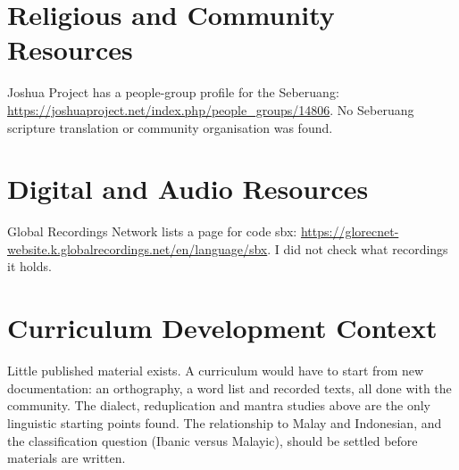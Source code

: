 \documentclass[12pt]{article}
\begin{document}
\section{Religious and Community Resources}
Joshua Project has a people-group profile for the Seberuang: \url{https://joshuaproject.net/index.php/people_groups/14806}. No Seberuang scripture translation or community organisation was found.

\section{Digital and Audio Resources}
Global Recordings Network lists a page for code sbx: \url{https://glorecnet-website.k.globalrecordings.net/en/language/sbx}. I did not check what recordings it holds.

\section{Curriculum Development Context}
Little published material exists. A curriculum would have to start from new documentation: an orthography, a word list and recorded texts, all done with the community. The dialect, reduplication and mantra studies above are the only linguistic starting points found. The relationship to Malay and Indonesian, and the classification question (Ibanic versus Malayic), should be settled before materials are written.
\end{document}
